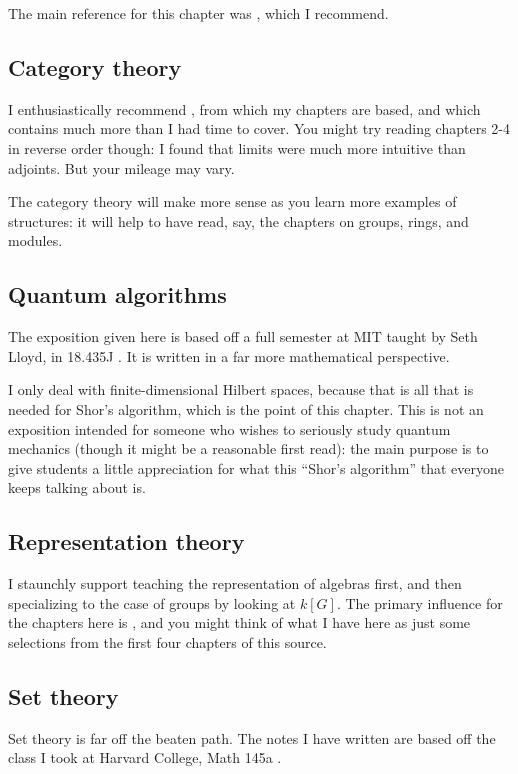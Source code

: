 The main reference for this chapter was \cite{ref:dartmouth}, which I recommend.

\subsection{Category theory}
I enthusiastically recommend \cite{ref:msci},
from which my chapters are based,
and which contains much more than I had time to cover.
You might try reading chapters {2-4} in reverse order though:
I found that limits were much more intuitive than adjoints.
But your mileage may vary.

The category theory will make more sense as you learn
more examples of structures: it will help to have read,
say, the chapters on groups, rings, and modules.

\subsection{Quantum algorithms}
The exposition given here is based off a full semester
at MIT taught by Seth Lloyd, in 18.435J \cite{ref:18-435}.
It is written in a far more mathematical perspective.

I only deal with finite-dimensional Hilbert spaces,
because that is all that is needed for Shor's algorithm,
which is the point of this chapter.
This is not an exposition intended for someone who wishes to seriously
study quantum mechanics (though it might be a reasonable first read):
the main purpose is to give students a little appreciation for
what this ``Shor's algorithm'' that everyone keeps talking about is.

\subsection{Representation theory}
I staunchly support teaching the representation of algebras first,
and then specializing to the case of groups by looking at $k[G]$.
The primary influence for the chapters here is \cite{ref:etingof},
and you might think of what I have here as just some selections
from the first four chapters of this source.

\subsection{Set theory}
Set theory is far off the beaten path.
The notes I have written are based off the class
I took at Harvard College, Math 145a \cite{ref:145a}.

